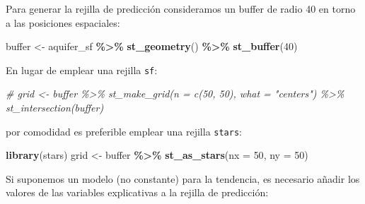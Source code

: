 \documentclass[
]{book}
\newenvironment{Shaded}{\begin{snugshade}}{\end{snugshade}}
\newcommand{\AttributeTok}[1]{\textcolor[rgb]{0.13,0.29,0.53}{#1}}
\newcommand{\CommentTok}[1]{\textcolor[rgb]{0.56,0.35,0.01}{\textit{#1}}}
\newcommand{\DecValTok}[1]{\textcolor[rgb]{0.00,0.00,0.81}{#1}}
\newcommand{\FunctionTok}[1]{\textcolor[rgb]{0.13,0.29,0.53}{\textbf{#1}}}
\newcommand{\NormalTok}[1]{#1}
\newcommand{\OtherTok}[1]{\textcolor[rgb]{0.56,0.35,0.01}{#1}}
\newcommand{\SpecialCharTok}[1]{\textcolor[rgb]{0.81,0.36,0.00}{\textbf{#1}}}
\theoremstyle{break}
\theoremstyle{definition}
\theoremstyle{definition}
\theoremstyle{definition}
\theoremstyle{definition}
\theoremstyle{remark}
\begin{document}
Para generar la rejilla de predicción consideramos un buffer de radio 40 en torno a las posiciones espaciales:

\begin{Shaded}
\begin{Highlighting}[]
\NormalTok{buffer }\OtherTok{\textless{}{-}}\NormalTok{ aquifer\_sf }\SpecialCharTok{\%\textgreater{}\%} \FunctionTok{st\_geometry}\NormalTok{() }\SpecialCharTok{\%\textgreater{}\%} \FunctionTok{st\_buffer}\NormalTok{(}\DecValTok{40}\NormalTok{)}
\end{Highlighting}
\end{Shaded}

En lugar de emplear una rejilla \texttt{sf}:

\begin{Shaded}
\begin{Highlighting}[]
\CommentTok{\# grid \textless{}{-} buffer \%\textgreater{}\% st\_make\_grid(n = c(50, 50), what = "centers") \%\textgreater{}\% st\_intersection(buffer)}
\end{Highlighting}
\end{Shaded}

por comodidad es preferible emplear una rejilla \texttt{stars}:

\begin{Shaded}
\begin{Highlighting}[]
\FunctionTok{library}\NormalTok{(stars)}
\NormalTok{grid }\OtherTok{\textless{}{-}}\NormalTok{ buffer }\SpecialCharTok{\%\textgreater{}\%}  \FunctionTok{st\_as\_stars}\NormalTok{(}\AttributeTok{nx =} \DecValTok{50}\NormalTok{, }\AttributeTok{ny =} \DecValTok{50}\NormalTok{)}
\end{Highlighting}
\end{Shaded}

Si suponemos un modelo (no constante) para la tendencia, es necesario añadir los valores de las variables explicativas a la rejilla de predicción:

\begin{Shaded}
\end{Shaded}
\end{document}
